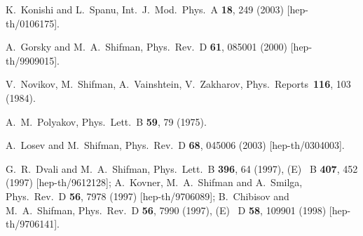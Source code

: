 \documentclass[12pt,epsf]{article}
\begin{document}
\begin{thebibliography}{99}
K.~Konishi and L.~Spanu,
Int.\ J.\ Mod.\ Phys.\ A {\bf 18}, 249 (2003)
[hep-th/0106175].





A.~Gorsky and M.~A.~Shifman,
Phys.\ Rev.\ D {\bf 61}, 085001 (2000)
[hep-th/9909015].









V.~Novikov, M.~Shifman, A.~Vainshtein,  V.~Zakharov,
Phys.\ Reports\  {\bf 116}, 103 (1984).






A.~M.~Polyakov,
Phys.\ Lett.\ B {\bf 59}, 79 (1975).

A.~Losev and M.~Shifman,
Phys.\ Rev.\ D {\bf 68}, 045006 (2003)
[hep-th/0304003].

G.~R.~Dvali and M.~A.~Shifman,
Phys.\ Lett.\ B {\bf 396}, 64 (1997), (E)
\ B {\bf 407}, 452 (1997)
[hep-th/9612128];
A.~Kovner, M.~A.~Shifman and A.~Smilga,
Phys.\ Rev.\ D {\bf 56}, 7978 (1997)
[hep-th/9706089];
B.~Chibisov and M.~A.~Shifman,
Phys.\ Rev.\ D {\bf 56}, 7990 (1997), (E)
\ D {\bf 58}, 109901 (1998)
[hep-th/9706141].



\end{thebibliography}
\end{document}
